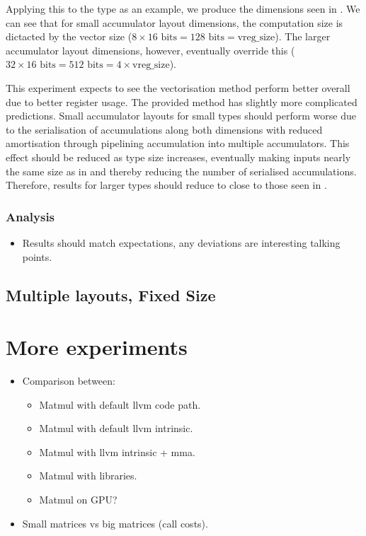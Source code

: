 \documentclass[\main/thesis.tex]{subfiles}
\begin{document}
Applying this to the  type as an example, we produce the dimensions seen in .
We can see that for small accumulator layout dimensions, the computation size is dictacted by the vector size ($8 \times 16 \text{ bits} = 128 \text{ bits} = \text{vreg\_size}$).
The larger accumulator layout dimensions, however, eventually override this ($32 \times 16 \text{ bits} = 512 \text{ bits} = 4 \times \text{vreg\_size}$).

This experiment expects to see the \gls{vectorisation} method perform better overall due to better register usage.
The provided method has slightly more complicated predictions.
Small accumulator layouts for small types should perform worse due to the serialisation of accumulations along both dimensions with reduced amortisation through pipelining accumulation into multiple accumulators.
This effect should be reduced as type size increases, eventually making inputs nearly the same size as in  and thereby reducing the number of serialised accumulations.
Therefore, results for larger types should reduce to close to those seen in .

\subsubsection{Analysis}
\begin{itemize}
  \item Results should match expectations, any deviations are interesting talking points.
\end{itemize}

\subsection{Multiple layouts, Fixed Size}

\section{More experiments}
\begin{itemize}
  \item Comparison between:
  \begin{itemize}
    \item Matmul with default llvm code path.
    \item Matmul with default llvm intrinsic.
    \item Matmul with llvm intrinsic + mma.
    \item Matmul with libraries.
    \item Matmul on GPU?
  \end{itemize}
\end{itemize}

\begin{itemize}
  \item Small matrices vs big matrices (call costs).
\end{itemize}
\end{document}

